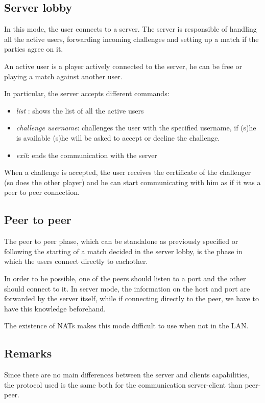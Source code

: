 \subsection{Server lobby}
In this mode, the user connects to a server. The server is responsible of handling all the active users, forwarding incoming challenges and setting up a match if the parties agree on it.

An active user is a player actively connected to the server, he can be free or playing a match against another user.

In particular, the server accepts different commands:
\begin{itemize}
	\item \textit{list} : shows the list of all the active users
	\item \textit{challenge username}:  challenges the user with the specified username, if (s)he is available (s)he will be asked to accept or decline the challenge.
	\item \textit{exit}: ends the communication with the server
\end{itemize}

When a challenge is accepted, the user receives the certificate of the challenger (so does the other player) and he can start communicating with him as if it was a peer to peer connection.

\subsection{Peer to peer}
The peer to peer phase, which can be standalone as previously specified or following the starting of a match decided in the server lobby, is the phase in which the users connect directly to eachother.

In order to be possible, one of the peers should listen to a port and the other should connect to it. In server mode, the information on the host and port are forwarded by the server itself, while if connecting directly to the peer, we have to have this knowledge beforehand.

The existence of NATs makes this mode difficult to use when not in the LAN.

\subsection{Remarks}
Since there are no main differences between the server and clients capabilities, the protocol used is the same both for the communication server-client than peer-peer.




